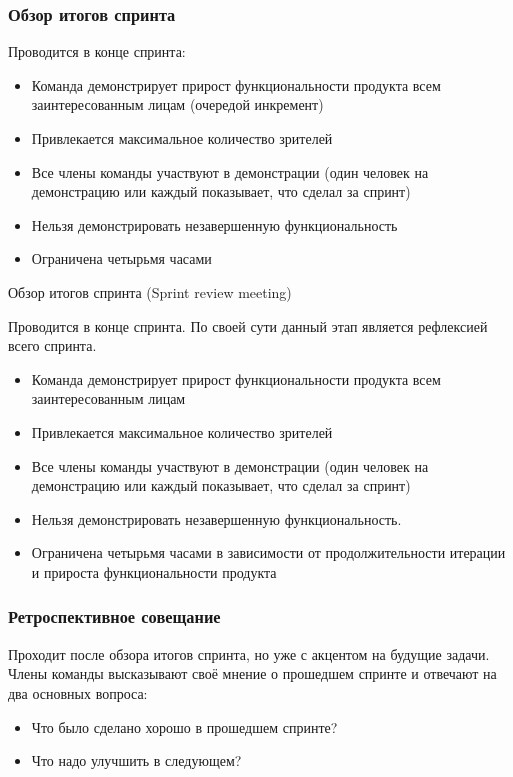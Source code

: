 \documentclass{../industrial-development}
\begin{document}
\begin{frame} \frametitle{Обзор итогов спринта}
Проводится в конце спринта:
\begin{itemize}
\item Команда демонстрирует прирост функциональности продукта всем заинтересованным лицам (очередой \alert{инкремент})
\item Привлекается максимальное количество зрителей
\item Все члены команды участвуют в демонстрации (один человек на демонстрацию или каждый показывает, что сделал за спринт)
\item Нельзя демонстрировать незавершенную функциональность
\item Ограничена четырьмя часами
\end{itemize}
\end{frame}
\lecturenotes
Обзор итогов спринта (Sprint review meeting)
\begin {block}
Проводится в конце спринта. По своей сути данный этап является рефлексией всего спринта.\end {block}
\begin{itemize}
\item Команда демонстрирует прирост функциональности продукта всем заинтересованным лицам
\item Привлекается максимальное количество зрителей
\item Все члены команды участвуют в демонстрации (один человек на демонстрацию или каждый показывает, что сделал за спринт)
\item Нельзя демонстрировать незавершенную функциональность.
\item Ограничена четырьмя часами в зависимости от продолжительности итерации и прироста функциональности продукта~\cite{Scrum}
\end{itemize}


\begin{frame} \frametitle{Ретроспективное совещание}
Проходит после обзора \alert{итогов спринта}, но уже с акцентом на будущие задачи. Члены команды высказывают своё мнение о прошедшем спринте и отвечают на два основных вопроса:
\begin{block}{}
\begin{itemize}
\item Что было сделано хорошо в прошедшем спринте?
\item Что надо улучшить в следующем?
\end{itemize}
\end{block}
\end{frame}
\end{document}
